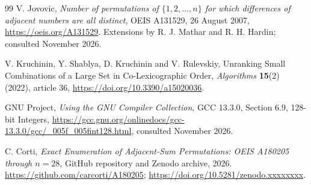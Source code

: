 \documentclass[11pt]{article}
\theoremstyle{definition}
\theoremstyle{remark}
\begin{document}
\begin{thebibliography}{99}
V. Jovovic,
\emph{Number of permutations of $\{1,2,\ldots,n\}$ for which differences
of adjacent numbers are all distinct},
OEIS A131529, 26 August 2007,
\url{https://oeis.org/A131529}.
Extensions by R. J. Mathar and R. H. Hardin; consulted November 2026.

V. Kruchinin, Y. Shablya, D. Kruchinin and V. Rulevskiy,
Unranking Small Combinations of a Large Set in Co-Lexicographic Order,
\emph{Algorithms} \textbf{15}(2) (2022), article 36,
\url{https://doi.org/10.3390/a15020036}.

GNU Project,
\emph{Using the GNU Compiler Collection}, GCC 13.3.0,
Section 6.9, 128-bit Integers,
\url{https://gcc.gnu.org/onlinedocs/gcc-13.3.0/gcc/_005f_005fint128.html},
consulted November 2026.

C. Corti,
\emph{Exact Enumeration of Adjacent-Sum Permutations: OEIS A180205 through
$n=28$}, GitHub repository and Zenodo archive, 2026.
\url{https://github.com/carcorti/A180205};
\url{https://doi.org/10.5281/zenodo.xxxxxxxx}.

\end{thebibliography}
\end{document}
